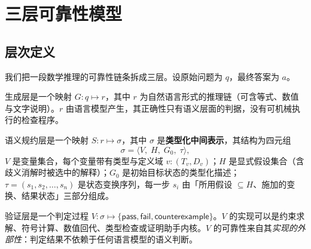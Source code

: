 \section{三层可靠性模型}\label{sec:model}

\subsection{层次定义}

我们把一段数学推理的可靠性链条拆成三层。设原始问题为 $q$，最终答案为 $a$。

\begin{definition}[生成层 L1]\label{def:l1}
生成层是一个映射 $G: q \mapsto r$，其中 $r$ 为自然语言形式的推理链（可含等式、数值与文字说明）。$r$ 由语言模型产生，其正确性只有语义层面的判据，没有可机械执行的检查程序。
\end{definition}

\begin{definition}[语义规约层 L2]\label{def:l2}
语义规约层是一个映射 $S: r \mapsto \sigma$，其中 $\sigma$ 是\textbf{类型化中间表示}，其结构为四元组
\[
\sigma = \langle V,\; H,\; G_0,\; \tau \rangle,
\]
$V$ 是变量集合，每个变量带有类型与定义域 $v: (T_v, D_v)$；$H$ 是显式假设集合（含歧义消解时被选中的解释）；$G_0$ 是初始目标状态的类型化描述；$\tau = (s_1, s_2, \dots, s_n)$ 是状态变换序列，每一步 $s_i$ 由「所用假设 $\subseteq H$、施加的变换、结果状态」三部分组成。
\end{definition}

\begin{definition}[验证层 L3]\label{def:l3}
验证层是一个判定过程 $V: \sigma \mapsto \{\textsf{pass}, \textsf{fail}, \textsf{counterexample}\}$。$V$ 的实现可以是约束求解、符号计算、数值回代、类型检查或证明助手内核。$V$ 的可靠性来自其\emph{实现的外部性}：判定结果不依赖于任何语言模型的语义判断。
\end{definition}

